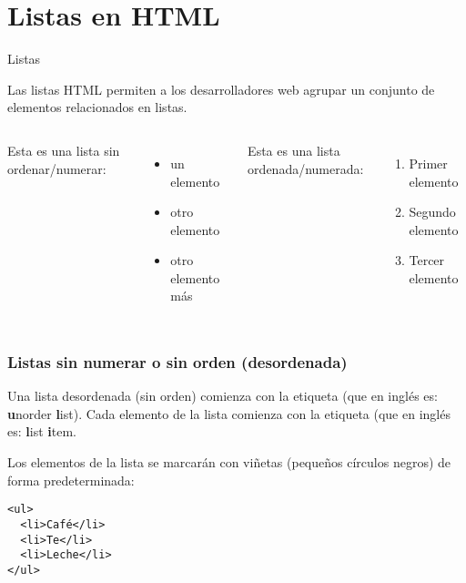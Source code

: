 
\section{Listas en HTML}

\begin{frame}[c]{Listas}

  Las listas HTML permiten a los desarrolladores web agrupar
  un conjunto de elementos relacionados en listas.

  \vspace{\baselineskip}
  \begin{columns}
      Esta es una lista sin ordenar/numerar:
      \begin{itemize}
        \item un elemento
        \item otro elemento
        \item otro elemento más 
      \end{itemize}
      Esta es una lista ordenada/numerada:
      \begin{enumerate}
        \item Primer elemento
        \item Segundo elemento
        \item Tercer elemento
      \end{enumerate}
  \end{columns}
\end{frame}

\begin{frame}[fragile]
  \frametitle{Listas sin numerar o sin orden (desordenada)}

  Una lista desordenada (sin orden) comienza con la
  etiqueta  (que en inglés
  es: \textbf{u}norder \textbf{l}ist).
  Cada elemento de la lista comienza con la etiqueta  (que en
  inglés es: \textbf{l}ist \textbf{i}tem.

  \vspace{\baselineskip}
  Los elementos de la lista se marcarán con viñetas
  (pequeños círculos negros) de forma predeterminada:

  \vspace{\baselineskip}
  \begin{lstlisting}
<ul>
  <li>Café</li>
  <li>Te</li>
  <li>Leche</li>
</ul>  
  \end{lstlisting}
\end{frame}

